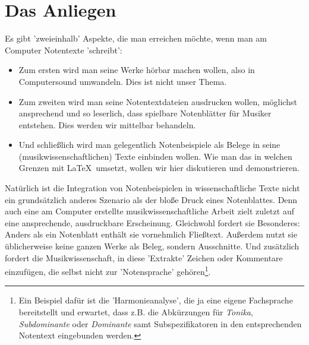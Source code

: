 %
%
%



\section{Das Anliegen}

Es gibt 'zweieinhalb' Aspekte, die man erreichen möchte, wenn man am Computer
Notentexte 'schreibt':

\begin{itemize}
  \item Zum ersten wird man seine Werke hörbar machen wollen, also in
  Computersound umwandeln. Dies ist nicht unser Thema.
  \item Zum zweiten wird man seine Notentextdateien ausdrucken wollen, möglichst
  ansprechend und so leserlich, dass spielbare Notenblätter für Musiker
  entstehen. Dies werden wir mittelbar behandeln.
  \item Und schließlich wird man gelegentlich Notenbeispiele als Belege in seine
  (musikwissenschaftlichen) Texte einbinden wollen. Wie man das in welchen
  Grenzen mit \LaTeX\ umsetzt, wollen wir hier diskutieren und demonstrieren.
\end{itemize}

Natürlich ist die Integration von Notenbeispielen in wissenschaftliche Texte
nicht ein grundsätzlich anderes Szenario als der bloße Druck eines Notenblattes.
Denn auch eine am Computer erstellte musikwissenschaftliche Arbeit zielt zuletzt
auf eine ansprechende, ausdruckbare Erscheinung. Gleichwohl fordert sie
Besonderes: Anders als ein Notenblatt enthält sie vornehmlich Fließtext.
Außerdem nutzt sie üblicherweise keine ganzen Werke als Beleg, sondern
Ausschnitte. Und zusätzlich fordert die Musikwissenschaft, in diese 'Extrakte'
Zeichen oder Kommentare einzufügen, die selbst nicht zur 'Notensprache'
gehören\footnote{Ein Beispiel dafür ist die 'Harmonieanalyse', die ja eine
eigene Fachsprache bereitstellt und erwartet, dass z.B. die Abkürzungen für
\emph{Tonika}, \emph{Subdominante} oder \emph{Dominante} samt Subspezifikatoren
in den entsprechenden Notentext eingebunden werden.}.

